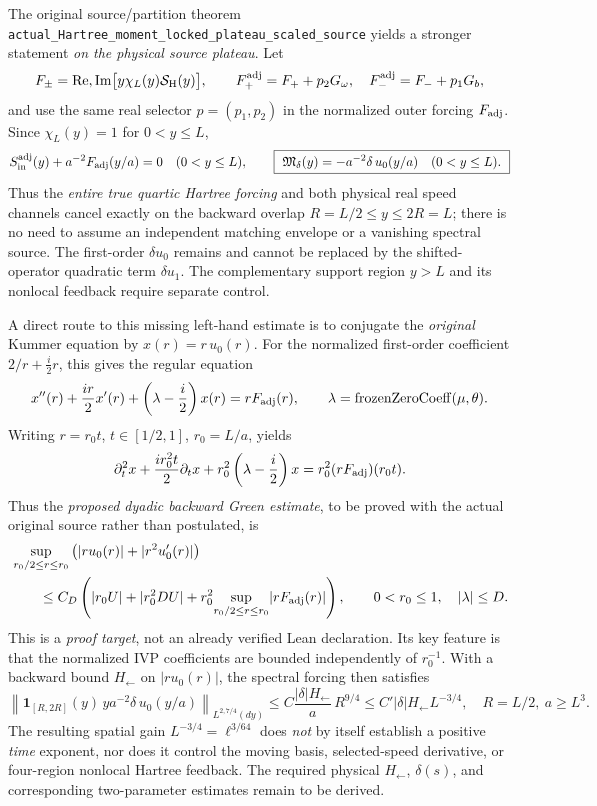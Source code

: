 \documentclass[11pt]{amsart}
\begin{document}
The original source/partition theorem
\texttt{actual\_Hartree\_moment\_locked\_plateau\_scaled\_source}
yields a stronger statement \emph{on the physical source plateau}.
Let
\[
 F_\pm=\operatorname{Re,Im}\bigl[y\chi_L(y)
          \mathcal S_{\mathrm H}(y)\bigr],\qquad
 F_+^{\rm adj}=F_+ +p_2G_\omega,\quad
 F_-^{\rm adj}=F_-+p_1G_b ,
\]
and use the same real selector \(p=(p_1,p_2)\) in the
normalized outer forcing \(F_{\rm adj}\). Since
\(\chi_L(y)=1\) for \(0<y\le L\),
\[
 S_{\rm in}^{\rm adj}(y)
     +a^{-2}F_{\rm adj}(y/a)=0
 \quad(0<y\le L),\qquad
 \boxed{\ \mathfrak M_\delta(y)
   =-a^{-2}\delta\,u_0(y/a)\quad(0<y\le L).\ }
\]
Thus the \emph{entire true quartic Hartree forcing} and both
physical real speed channels cancel exactly on the backward
overlap \(R=L/2\le y\le2R=L\); there is no need to assume an
independent matching envelope or a vanishing spectral source.
The first-order \(\delta u_0\) remains and cannot be replaced
by the shifted-operator quadratic term \(\delta u_1\).
The complementary support region \(y>L\) and its nonlocal
feedback require separate control.


A direct route to this missing left-hand estimate is to conjugate
the \emph{original} Kummer equation by \(x(r)=r\,u_0(r)\).
For the normalized first-order coefficient
\(2/r+\tfrac{i}{2}r\), this gives the regular equation
\[
 x''(r)+\frac{ir}{2}x'(r)
      +\left(\lambda-\frac i2\right)x(r)=rF_{\rm adj}(r),
 \qquad \lambda=\operatorname{frozenZeroCoeff}(\mu,\theta).
\]
Writing \(r=r_0t\), \(t\in[1/2,1]\),
\(r_0=L/a\), yields
\[
 \partial_t^2 x+\frac{i r_0^2t}{2}\partial_t x+
 r_0^2\left(\lambda-\frac i2\right)x
     =r_0^2 (rF_{\rm adj})(r_0t).
\]
Thus the \emph{proposed dyadic backward Green estimate}, to be
proved with the actual original source rather than postulated, is
\[
\begin{split}
 &\sup_{r_0/2\le r\le r_0}
   \left(\lvert r u_0(r)\rvert+
         \lvert r^2u_0'(r)\rvert\right)\\
 &\qquad \le C_D
  \left(\lvert r_0U\rvert+
        \lvert r_0^2DU\rvert+
        r_0^2\!\sup_{r_0/2\le r\le r_0}
                         \lvert r F_{\rm adj}(r)\rvert\right),
 \qquad 0<r_0\le1,\quad |\lambda|\le D.
\end{split}
\]
This is a \emph{proof target}, not an already verified Lean
declaration.  Its key feature is that the normalized IVP
coefficients are bounded independently of \(r_0^{-1}\).
With a backward bound \(H_{\leftarrow}\) on
\(\lvert r u_0(r)\rvert\), the spectral forcing then satisfies
\[
 \left\|\mathbf1_{[R,2R]}(y)\,
   y a^{-2}\delta\,u_0(y/a)\right\|_{L^{2,7/4}(dy)}
 \le C\frac{|\delta|H_{\leftarrow}}{a}\,R^{9/4}
 \le C'|\delta|H_{\leftarrow}L^{-3/4},
 \quad R=L/2,\ a\ge L^3.
\]
The resulting spatial gain \(L^{-3/4}=\ell^{3/64}\)
does \emph{not} by itself establish a positive
\emph{time} exponent, nor does it control the moving
basis, selected-speed derivative, or four-region
nonlocal Hartree feedback. The required physical
\(H_{\leftarrow}\), \(\delta(s)\), and corresponding
two-parameter estimates remain to be derived.
\end{document}
